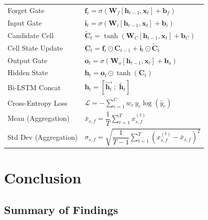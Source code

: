 \documentclass[12pt,a4paper]{article}
\begin{document}
\begin{longtable}{p{3.5cm}p{9.5cm}}
Forget Gate &
$\mathbf{f}_t = \sigma(\mathbf{W}_f[\mathbf{h}_{t-1}, \mathbf{x}_t] + \mathbf{b}_f)$ \\[0.8em]

Input Gate &
$\mathbf{i}_t = \sigma(\mathbf{W}_i[\mathbf{h}_{t-1}, \mathbf{x}_t] + \mathbf{b}_i)$ \\[0.8em]

Candidate Cell &
$\tilde{\mathbf{C}}_t = \tanh(\mathbf{W}_C[\mathbf{h}_{t-1}, \mathbf{x}_t] + \mathbf{b}_C)$ \\[0.8em]

Cell State Update &
$\mathbf{C}_t = \mathbf{f}_t \odot \mathbf{C}_{t-1} + \mathbf{i}_t \odot \tilde{\mathbf{C}}_t$ \\[0.8em]

Output Gate &
$\mathbf{o}_t = \sigma(\mathbf{W}_o[\mathbf{h}_{t-1}, \mathbf{x}_t] + \mathbf{b}_o)$ \\[0.8em]

Hidden State &
$\mathbf{h}_t = \mathbf{o}_t \odot \tanh(\mathbf{C}_t)$ \\[0.8em]

Bi-LSTM Concat &
$\mathbf{h}_t = [\overrightarrow{\mathbf{h}_t} \;;\; \overleftarrow{\mathbf{h}_t}]$ \\[0.8em]

Cross-Entropy Loss &
$\mathcal{L} = -\sum\limits_{c=1}^{C} w_c \, y_c \log(\hat{y}_c)$ \\[0.8em]

Mean (Aggregation) &
$\bar{x}_{s,f} = \dfrac{1}{T}\sum\limits_{t=1}^{T} x_{s,f}^{(t)}$ \\[0.8em]

Std Dev (Aggregation) &
$\sigma_{s,f} = \sqrt{\dfrac{1}{T-1}\sum\limits_{t=1}^{T}(x_{s,f}^{(t)} - \bar{x}_{s,f})^2}$ \\[0.8em]

\end{longtable}

\section{Conclusion}
\label{sec:conclusion}

\subsection{Summary of Findings}
\end{document}
